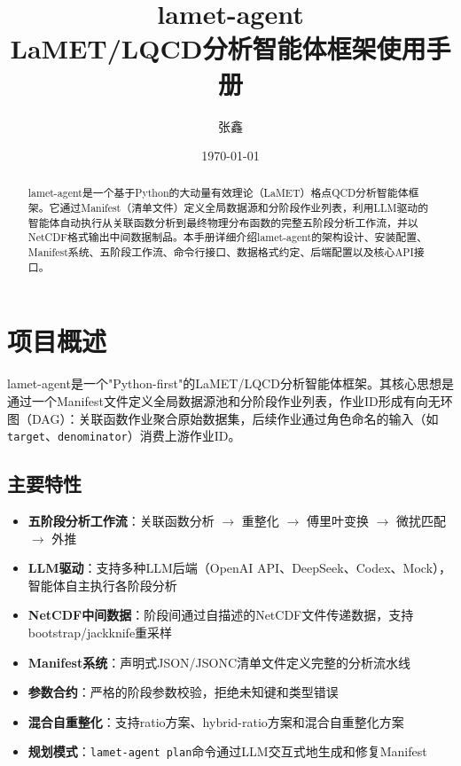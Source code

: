 \documentclass[12pt,a4paper]{ctexart}
\title{\heiti lamet-agent \\[3pt] \large LaMET/LQCD分析智能体框架使用手册}
\author{张鑫}
\date{\today}
\begin{document}
\maketitle

\begin{abstract}
\noindent
lamet-agent是一个基于Python的大动量有效理论（LaMET）格点QCD分析智能体框架。它通过Manifest（清单文件）定义全局数据源和分阶段作业列表，利用LLM驱动的智能体自动执行从关联函数分析到最终物理分布函数的完整五阶段分析工作流，并以NetCDF格式输出中间数据制品。本手册详细介绍lamet-agent的架构设计、安装配置、Manifest系统、五阶段工作流、命令行接口、数据格式约定、后端配置以及核心API接口。
\end{abstract}

\tableofcontents
\newpage

\section{项目概述}

lamet-agent是一个"Python-first"的LaMET/LQCD分析智能体框架。其核心思想是通过一个Manifest文件定义全局数据源池和分阶段作业列表，作业ID形成有向无环图（DAG）：关联函数作业聚合原始数据集，后续作业通过角色命名的输入（如\texttt{target}、\texttt{denominator}）消费上游作业ID。

\subsection{主要特性}
\begin{itemize}[leftmargin=*]
    \item \textbf{五阶段分析工作流}：关联函数分析 $\to$ 重整化 $\to$ 傅里叶变换 $\to$ 微扰匹配 $\to$ 外推
    \item \textbf{LLM驱动}：支持多种LLM后端（OpenAI API、DeepSeek、Codex、Mock），智能体自主执行各阶段分析
    \item \textbf{NetCDF中间数据}：阶段间通过自描述的NetCDF文件传递数据，支持bootstrap/jackknife重采样
    \item \textbf{Manifest系统}：声明式JSON/JSONC清单文件定义完整的分析流水线
    \item \textbf{参数合约}：严格的阶段参数校验，拒绝未知键和类型错误
    \item \textbf{混合自重整化}：支持ratio方案、hybrid-ratio方案和混合自重整化方案
    \item \textbf{规划模式}：\texttt{lamet-agent plan}命令通过LLM交互式地生成和修复Manifest
\end{itemize}
\end{document}
